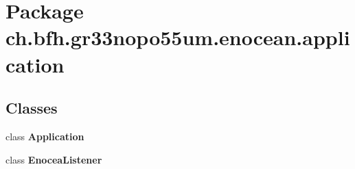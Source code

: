 \section{Package ch.\+bfh.\+gr33nopo55um.\+enocean.\+application}
\label{namespacech_1_1bfh_1_1gr33nopo55um_1_1enocean_1_1application}
\subsection*{Classes}
\begin{DoxyCompactItemize}
\item 
class {\bf Application}
\item 
class {\bf Enocea\+Listener}
\end{DoxyCompactItemize}
